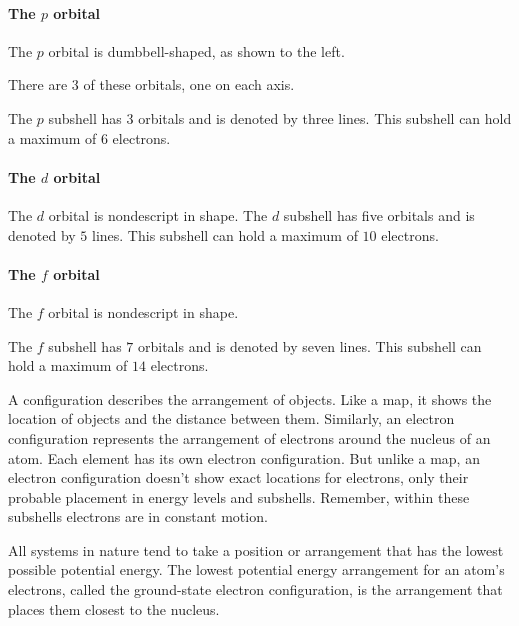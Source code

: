 \paragraph{The $p$ orbital} The $p$ orbital is dumbbell-shaped, as shown to the left.

There are $3$ of these orbitals, one on each axis.

The $p$ subshell has $3$ orbitals and is denoted by three lines. This subshell
can hold a maximum of $6$ electrons.

\paragraph{The $d$ orbital} The $d$ orbital is nondescript in shape. The $d$ subshell has five orbitals and
is denoted by $5$ lines. This subshell can hold a maximum of $10$ electrons.

\paragraph{The $f$ orbital} The $f$ orbital is nondescript in shape.

The $f$ subshell has $7$ orbitals and is denoted by seven lines. This subshell
can hold a maximum of $14$ electrons.

A configuration describes the arrangement of objects. Like a map, it shows the
location of objects and the distance between them. Similarly, an electron
configuration represents the arrangement of electrons around the nucleus of an
atom. Each element has its own electron configuration. But unlike a map, an
electron configuration doesn't show exact locations for electrons, only their
probable placement in energy levels and subshells. Remember, within these
subshells electrons are in constant motion.

All systems in nature tend to take a position or arrangement that has the lowest
possible potential energy. The lowest potential energy arrangement for an atom's
electrons, called the ground-state electron configuration, is the arrangement
that places them closest to the nucleus.
